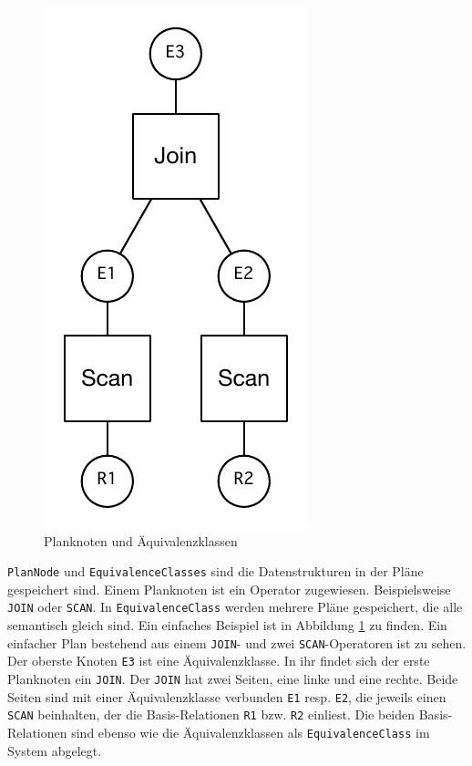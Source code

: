 \begin{figure}[ht]
  \centering
  \includegraphics{04_Implementierung/00_media/JoinScan.pdf}
  \caption{Planknoten und Äquivalenzklassen}
  \label{PlanAequi}
\end{figure}

\texttt{Plan\-Node} und \texttt{Equi\-valence\-Classes} sind die Datenstrukturen in der Pläne gespeichert sind. Einem Planknoten ist ein Operator zugewiesen. Beispielsweise \texttt{JOIN} oder \texttt{SCAN}. In \texttt{Equi\-valence\-Class} werden mehrere Pläne gespeichert, die alle semantisch gleich sind. Ein einfaches Beispiel ist in Abbildung \ref{PlanAequi} zu finden. Ein einfacher Plan bestehend aus einem \texttt{JOIN}- und zwei \texttt{SCAN}-Operatoren ist zu sehen. Der oberste Knoten \texttt{E3} ist eine Äquivalenzklasse. In ihr findet sich der erste Planknoten ein \texttt{JOIN}. Der \texttt{JOIN} hat zwei Seiten, eine linke und eine rechte. Beide Seiten sind mit einer Äquivalenzklasse verbunden \texttt{E1} resp. \texttt{E2}, die jeweils einen \texttt{SCAN} beinhalten, der die Basis-Relationen \texttt{R1} bzw. \texttt{R2} einliest. Die beiden Basis-Relationen sind ebenso wie die Äquivalenzklassen als \texttt{Equi\-valence\-Class} im System abgelegt.




